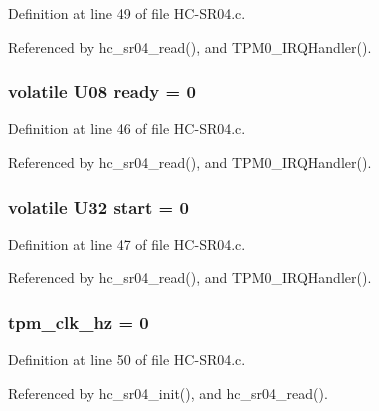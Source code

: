 Definition at line 49 of file H\+C-\/\+S\+R04.\+c.



Referenced by hc\+\_\+sr04\+\_\+read(), and T\+P\+M0\+\_\+\+I\+R\+Q\+Handler().

\subsubsection[{\texorpdfstring{ready}{ready}}]{\setlength{\rightskip}{0pt plus 5cm}volatile {\bf U08} ready = 0}\hypertarget{_h_c-_s_r04_8c_ad5ea6fe6d0c4db57abe39c72c5c17b87}{}\label{_h_c-_s_r04_8c_ad5ea6fe6d0c4db57abe39c72c5c17b87}


Definition at line 46 of file H\+C-\/\+S\+R04.\+c.



Referenced by hc\+\_\+sr04\+\_\+read(), and T\+P\+M0\+\_\+\+I\+R\+Q\+Handler().

\subsubsection[{\texorpdfstring{start}{start}}]{\setlength{\rightskip}{0pt plus 5cm}volatile {\bf U32} start = 0}\hypertarget{_h_c-_s_r04_8c_aafe0cd76d673304e5b435fdef6969662}{}\label{_h_c-_s_r04_8c_aafe0cd76d673304e5b435fdef6969662}


Definition at line 47 of file H\+C-\/\+S\+R04.\+c.



Referenced by hc\+\_\+sr04\+\_\+read(), and T\+P\+M0\+\_\+\+I\+R\+Q\+Handler().

\subsubsection[{\texorpdfstring{tpm\+\_\+clk\+\_\+hz}{tpm_clk_hz}}]{ tpm\+\_\+clk\+\_\+hz = 0}\hypertarget{_h_c-_s_r04_8c_a5d1011673607a4854ece241942a4d686}{}\label{_h_c-_s_r04_8c_a5d1011673607a4854ece241942a4d686}


Definition at line 50 of file H\+C-\/\+S\+R04.\+c.



Referenced by hc\+\_\+sr04\+\_\+init(), and hc\+\_\+sr04\+\_\+read().

